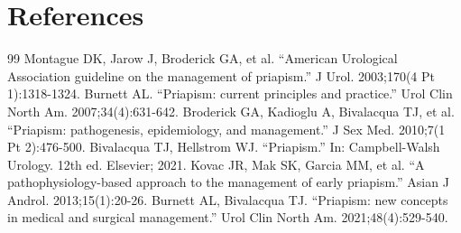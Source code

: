 \section*{References}
\begin{thebibliography}{99}
 Montague DK, Jarow J, Broderick GA, et al. ``American Urological Association guideline on the management of priapism.'' J Urol. 2003;170(4 Pt 1):1318-1324.
 Burnett AL. ``Priapism: current principles and practice.'' Urol Clin North Am. 2007;34(4):631-642.
 Broderick GA, Kadioglu A, Bivalacqua TJ, et al. ``Priapism: pathogenesis, epidemiology, and management.'' J Sex Med. 2010;7(1 Pt 2):476-500.
 Bivalacqua TJ, Hellstrom WJ. ``Priapism.'' In: Campbell-Walsh Urology. 12th ed. Elsevier; 2021.
 Kovac JR, Mak SK, Garcia MM, et al. ``A pathophysiology-based approach to the management of early priapism.'' Asian J Androl. 2013;15(1):20-26.
 Burnett AL, Bivalacqua TJ. ``Priapism: new concepts in medical and surgical management.'' Urol Clin North Am. 2021;48(4):529-540.
\end{thebibliography}

